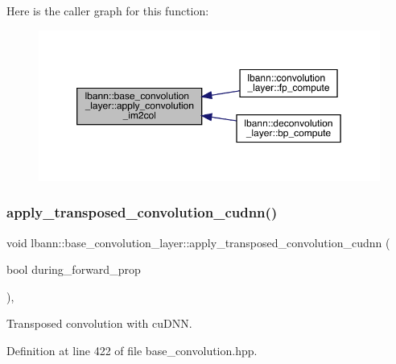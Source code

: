 Here is the caller graph for this function\+:\nopagebreak
\begin{figure}[H]
\begin{center}
\leavevmode
\includegraphics[width=350pt]{classlbann_1_1base__convolution__layer_a0710d46aa54d92f94de920ed37f6ef11_icgraph}
\end{center}
\end{figure}
\mbox{\label{classlbann_1_1base__convolution__layer_a130907ca7a8e3b6676bdd4186c788ef4}} 
\subsubsection{\texorpdfstring{apply\+\_\+transposed\+\_\+convolution\+\_\+cudnn()}{apply\_transposed\_convolution\_cudnn()}}
{\footnotesize\ttfamily void lbann\+::base\+\_\+convolution\+\_\+layer\+::apply\+\_\+transposed\+\_\+convolution\+\_\+cudnn (\begin{DoxyParamCaption}\item[{bool}]{during\+\_\+forward\+\_\+prop }\end{DoxyParamCaption})\hspace{0.3cm}{\ttfamily [inline]}, {\ttfamily [protected]}}

Transposed convolution with cu\+D\+NN. 

Definition at line 422 of file base\+\_\+convolution.\+hpp.


